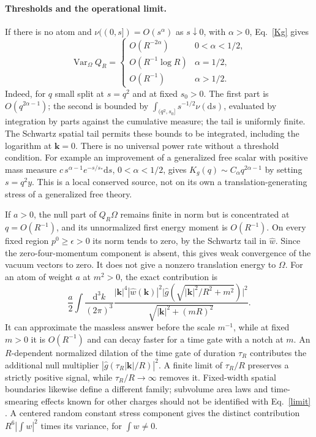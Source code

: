 \documentclass[11pt]{article}
\newcommand{\dd}{\mathrm d}
\newcommand{\Var}{\operatorname{Var}}
\newcommand{\kn}{\boldsymbol k}
\begin{document}
\paragraph{Thresholds and the operational limit.}
If there is no atom and \(\nu((0,s])=O(s^\alpha)\) as \(s\downarrow0\), with \(\alpha>0\), Eq.~\eqref{Kg} gives
\[
 \Var_\Omega Q_R=
 \begin{cases}
 O(R^{-2\alpha})&0<\alpha<1/2,\\
 O(R^{-1}\log R)&\alpha=1/2,\\
 O(R^{-1})&\alpha>1/2 .
 \end{cases}
\]
Indeed, for \(q\) small split at \(s=q^2\) and at fixed \(s_0>0\). The first part is \(O(q^{2\alpha-1})\); the second is bounded by \(\int_{(q^2,s_0]} s^{-1/2}\nu(\dd s)\), evaluated by integration by parts against the cumulative measure; the tail is uniformly finite. The Schwartz spatial tail permits these bounds to be integrated, including the logarithm at \(\kn=0\). There is no universal power rate without a threshold condition. For example an improvement of a generalized free scalar with positive mass measure \(c\,s^{\alpha-1}e^{-s/s_*}\dd s\), \(0<\alpha<1/2\), gives \(K_g(q)\sim C_\alpha q^{2\alpha-1}\) by setting \(s=q^2y\). This is a local conserved source, not on its own a translation-generating stress of a generalized free theory.

If \(a>0\), the null part of \(Q_R\Omega\) remains finite in norm but is concentrated at \(q=O(R^{-1})\), and its unnormalized first energy moment is \(O(R^{-1})\). On every fixed region \(p^0\ge\epsilon>0\) its norm tends to zero, by the Schwartz tail in \(\widehat w\). Since the zero-four-momentum component is absent, this gives weak convergence of the vacuum vectors to zero. It does not give a nonzero translation energy to \(\Omega\). For an atom of weight \(a\) at \(m^2>0\), the exact contribution is
\[
 \frac a2\int\frac{\dd^3k}{(2\pi)^3}
 \frac{|\kn|^4|\widehat w(\kn)|^2
 \big|\widehat g(\sqrt{|\kn|^2/R^2+m^2})\big|^2}
 {\sqrt{|\kn|^2+(mR)^2}} .
\]
It can approximate the massless answer before the scale \(m^{-1}\), while at fixed \(m>0\) it is \(O(R^{-1})\) and can decay faster for a time gate with a notch at \(m\). An \(R\)-dependent normalized dilation of the time gate of duration \(\tau_R\) contributes the additional null multiplier \(|\widehat g(\tau_R|\kn|/R)|^2\). A finite limit of \(\tau_R/R\) preserves a strictly positive signal, while \(\tau_R/R\to\infty\) removes it. Fixed-width spatial boundaries likewise define a different family; subvolume area laws and time-smearing effects known for other charges should not be identified with Eq.~\eqref{limit} \cite{BOY,MS}. A centered random constant stress component gives the distinct contribution \(R^6|\int w|^2\) times its variance, for \(\int w\ne0\).
\end{document}
